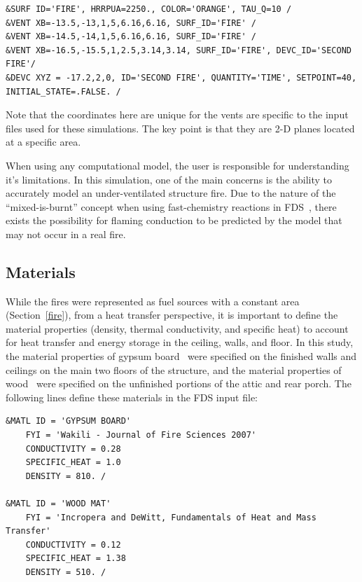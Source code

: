 \begin{lstlisting}
&SURF ID='FIRE', HRRPUA=2250., COLOR='ORANGE', TAU_Q=10 /
&VENT XB=-13.5,-13,1,5,6.16,6.16, SURF_ID='FIRE' / 
&VENT XB=-14.5,-14,1,5,6.16,6.16, SURF_ID='FIRE' / 
&VENT XB=-16.5,-15.5,1,2.5,3.14,3.14, SURF_ID='FIRE', DEVC_ID='SECOND FIRE'/ 
&DEVC XYZ = -17.2,2,0, ID='SECOND FIRE', QUANTITY='TIME', SETPOINT=40, INITIAL_STATE=.FALSE. /
\end{lstlisting}
Note that the coordinates here are unique for the vents are specific to the input files used for these simulations. The key point is that they are 2-D planes located at a specific area.

When using any computational model, the user is responsible for understanding it's limitations. In this simulation, one of the main concerns is the ability to accurately model an under-ventilated structure fire. Due to the nature of the ``mixed-is-burnt'' concept when using fast-chemistry reactions in FDS~\cite{FDS_Tech_Guide}, there exists the possibility for flaming conduction to be predicted by the model that may not occur in a real fire. 

\subsection{Materials}
\label{matl}
While the fires were represented as fuel sources with a constant area (Section~\ref{fire}), from a heat transfer perspective, it is important to define the material properties (density, thermal conductivity, and specific heat) to account for heat transfer and energy storage in the ceiling, walls, and floor. In this study, the material properties of gypsum board~\cite{WAKILI2007} were specified on the finished walls and ceilings on the main two floors of the structure, and the material properties of wood~\cite{Incropera:1} were specified on the unfinished portions of the attic and rear porch. The following lines define these materials in the FDS input file:

\clearpage

\begin{lstlisting}
&MATL ID = 'GYPSUM BOARD'
    FYI = 'Wakili - Journal of Fire Sciences 2007' 
    CONDUCTIVITY = 0.28
    SPECIFIC_HEAT = 1.0
    DENSITY = 810. /

&MATL ID = 'WOOD MAT'
    FYI = 'Incropera and DeWitt, Fundamentals of Heat and Mass Transfer'
    CONDUCTIVITY = 0.12
    SPECIFIC_HEAT = 1.38
    DENSITY = 510. / 
\end{lstlisting}

